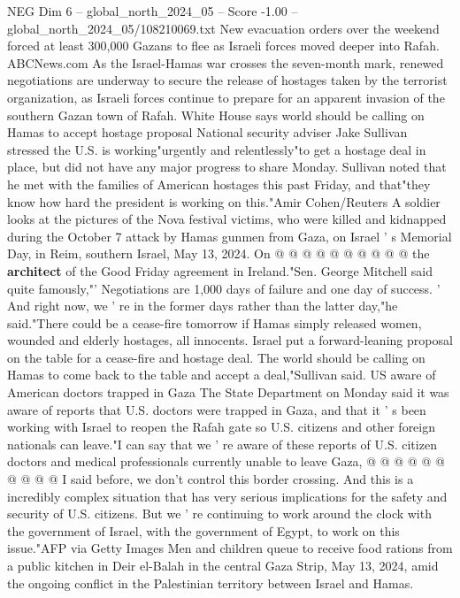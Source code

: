 \begin{textsample}{NEG Dim 6 – global\_north\_2024\_05 – Score -1.00 – global\_north\_2024\_05/108210069.txt}  \label{ex:f6_neg_296}
New evacuation orders over the weekend forced at least 300,000 Gazans to flee as Israeli forces moved deeper into Rafah.
ABCNews.com As the Israel-Hamas war crosses the seven-month mark, renewed negotiations are underway to secure the release of hostages taken by the terrorist organization, as Israeli forces continue to prepare for an apparent invasion of the southern Gazan town of Rafah.
White House says world should be calling on Hamas to accept hostage proposal National security adviser Jake Sullivan stressed the U.S. is working"urgently and relentlessly"to get a hostage deal in place, but did not have any major progress to share Monday.
Sullivan noted that he met with the families of American hostages this past Friday, and that"they know how hard the president is working on this."Amir Cohen/Reuters A soldier looks at the pictures of the Nova festival victims, who were killed and kidnapped during the October 7 attack by Hamas gunmen from Gaza, on Israel ' s Memorial Day, in Reim, southern Israel, May 13, 2024.
On @ @ @ @ @ @ @ @ @ @ the \textbf{architect} of the Good Friday agreement in Ireland."Sen.
George Mitchell said quite famously,"' Negotiations are 1,000 days of failure and one day of success. ' And right now, we ' re in the former days rather than the latter day,"he said."There could be a cease-fire tomorrow if Hamas simply released women, wounded and elderly hostages, all innocents.
Israel put a forward-leaning proposal on the table for a cease-fire and hostage deal.
The world should be calling on Hamas to come back to the table and accept a deal,"Sullivan said.
US aware of American doctors trapped in Gaza The State Department on Monday said it was aware of reports that U.S. doctors were trapped in Gaza, and that it ' s been working with Israel to reopen the Rafah gate so U.S. citizens and other foreign nationals can leave."I can say that we ' re aware of these reports of U.S. citizen doctors and medical professionals currently unable to leave Gaza, @ @ @ @ @ @ @ @ @ @ I said before, we don't control this border crossing.
And this is a incredibly complex situation that has very serious implications for the safety and security of U.S. citizens.
But we ' re continuing to work around the clock with the government of Israel, with the government of Egypt, to work on this issue."AFP via Getty Images Men and children queue to receive food rations from a public kitchen in Deir el-Balah in the central Gaza Strip, May 13, 2024, amid the ongoing conflict in the Palestinian territory between Israel and Hamas.

\end{textsample}

